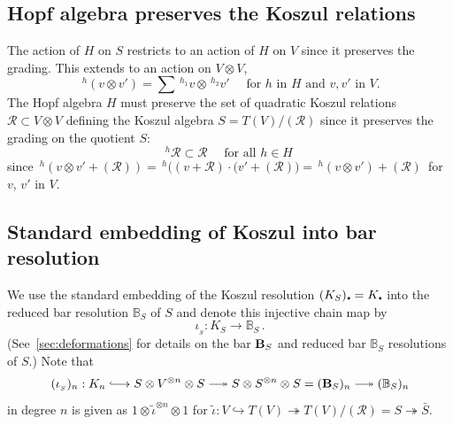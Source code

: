 \documentclass[11pt]{amsart}
\numberwithin{equation}{section}
\DeclareRobustCommand\longtwoheadrightarrow{\relbar\joinrel\twoheadrightarrow}
\newcommand{\R}{\mathcal{R}}
\newcommand{\sd}{_{\DOT}}%
\newcommand{\B}{{\bf B}} %
\newcommand{\BB}{\mathbb{B}} %
\newcommand{\hooklongrightarrow}{\lhook\joinrel\longrightarrow} %
\newcommand{\DOT}{\setlength{\unitlength}{1.2pt}\begin{picture}(2.5,2)
               (1,1)\put(2.5,2.5){\circle*{2}}\end{picture}}
\renewcommand{\_}[1]{\mbox{$_{\left( #1 \right)}$}}
\newcommand{\ot}{\otimes}
\newcommand{\Ho}{H}%
\begin{document}
{%
\subsection*{Hopf algebra preserves the Koszul relations}
The action of $\Ho$ on $S$ restricts to an action  
of $\Ho$ on $V$ since  it preserves the grading. 
This extends to an action on $V\ot V$, 
$$\, ^h(v\ot v')=\sum \, ^{h_1}v\ot \, ^{h_2} v'
\quad\text{ for $h$ in $\Ho$ and $v,v'$ in $V$.}
$$
The Hopf algebra $\Ho$ 
must preserve the set of quadratic Koszul relations 
$\R\subset V\ot V$
defining the Koszul algebra $S=T(V)/(\mathcal{R})$
since it preserves the grading on the quotient $S$: 
\begin{equation}
   \label{hopfpreserveskoszulrelations}
  ^h \mathcal{R}
\subset\R\quad \text{ for all }
h\in \Ho\, 
\end{equation}
since
$\, ^h(v\ot v' + (\R))
=\, ^h\big( (v+\R) \cdot (v' + (\R)\big)
= \, ^h(v\ot v')+(\R) \, 
$ 
for  $v$, $v'$ in $V$.



\subsection*{Standard embedding of Koszul into bar resolution}
We use the standard embedding of the Koszul resolution $(K_S)\sd=K\sd$
into the reduced bar resolution $\BB_{S}$ of $S$ and denote this
injective chain map by
\begin{equation}\label{KoszulStandardEmbedding}
  \iota_{_S}: K_S\longrightarrow \BB_S\, .
\end{equation}
(See~\cref{sec:deformations} for details on the bar $\B_S$ and reduced
bar $\BB_S$ resolutions of $S$.)
Note that
\begin{equation}\label{eqn:iotaSn}
  (\iota_{_S})_n: K_n\hooklongrightarrow S\ot V^{\ot n}\ot S
\longtwoheadrightarrow S\ot S^{\ot n} \ot S
=(\B_S)_n \longtwoheadrightarrow (\BB_S)_n
\end{equation}
in degree $n$ is given as $1\ot \tilde{\iota}^{ \ot n}\ot 1$
for $\tilde{\iota}:
V\hookrightarrow T(V)\twoheadrightarrow T(V)/(\mathcal{R})=S
\twoheadrightarrow \bar{S}$.
% 




}
\end{document}
